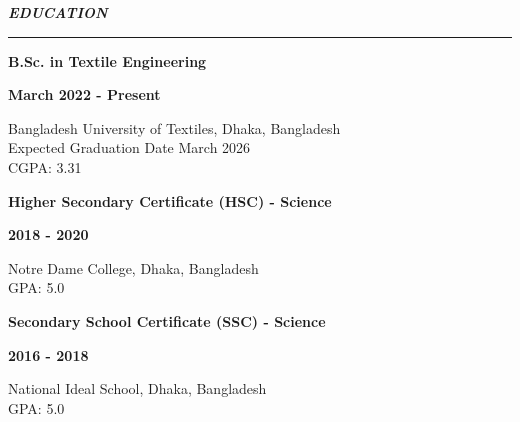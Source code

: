 {\noindent\fontsize{13pt}{16pt}\bfseries\itshape EDUCATION\par}
\vspace{0.5em}
\hrule
\vspace{0.7em}
\noindent
\begin{minipage}[t]{0.50\textwidth}
    \raggedright
    {\fontsize{12pt}{15pt}\bfseries B.Sc. in Textile Engineering}
\end{minipage}%
\hfill
\begin{minipage}[t]{0.50\textwidth}
    \raggedleft
    {\fontsize{12pt}{15pt}\bfseries March 2022 - Present}
\end{minipage}
Bangladesh University of Textiles, Dhaka, Bangladesh\\
Expected Graduation Date March 2026\\
CGPA: 3.31 \\

\noindent
\begin{minipage}[t]{0.50\textwidth}
    \raggedright
    {\fontsize{12pt}{15pt}\bfseries Higher Secondary Certificate (HSC) - Science}
\end{minipage}%
\hfill
\begin{minipage}[t]{0.50\textwidth}
    \raggedleft
    {\fontsize{12pt}{15pt}\bfseries 2018 - 2020}
\end{minipage}
Notre Dame College, Dhaka, Bangladesh\\
GPA: 5.0 \\


\noindent
\begin{minipage}[t]{0.50\textwidth}
    \raggedright
    {\fontsize{12pt}{15pt}\bfseries Secondary School Certificate (SSC) - Science}
\end{minipage}%
\hfill
\begin{minipage}[t]{0.50\textwidth}
    \raggedleft
    {\fontsize{12pt}{15pt}\bfseries 2016 - 2018}
\end{minipage}
National Ideal School, Dhaka, Bangladesh\\
GPA: 5.0 \\ \\
